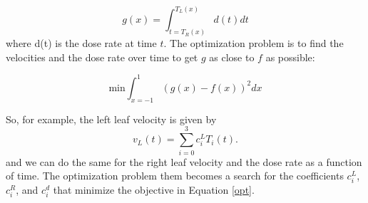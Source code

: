 \begin{equation}
  g(x) = \int_{t = T_R(x)}^{T_L(x)} d(t) dt
\end{equation}
\noindent where d(t) is the dose rate at time $t$.
The optimization problem is to find the velocities and the dose rate over time to get $g$ as close to $f$ as possible:

\begin{equation}
\mathrm{min} \int_{x=-1}^1 \left ( g(x) - f(x) \right )^2 dx
\label{opt}
\end{equation}

So, for example, the left leaf velocity is given by
$$
v_L(t) = \sum_{i=0}^3 c^L_i T_i(t).
$$
\noindent and we can do the same for the right leaf velocity and the dose rate as a function of time.
The optimization problem them becomes a search for the coefficients $c^L_i$, $c^R_i$, and $c^d_i$ that minimize the objective in Equation \ref{opt}.
